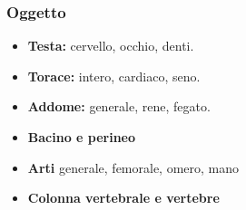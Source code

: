 \subsubsection{Oggetto}
\begin{itemize}
    \item \textbf{Testa:} cervello, occhio, denti.
    \item \textbf{Torace:} intero, cardiaco, seno.
    \item \textbf{Addome:} generale, rene, fegato.
    \item \textbf{Bacino e perineo}
    \item \textbf{Arti} generale, femorale, omero, mano
    \item \textbf{Colonna vertebrale e vertebre}
\end{itemize}




